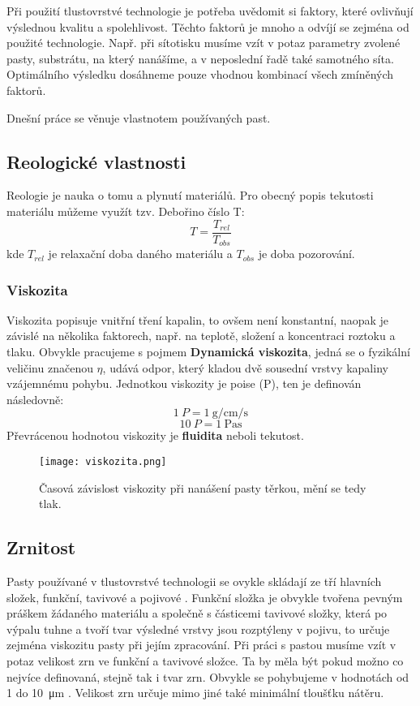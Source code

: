 Při použití tlustovrstvé technologie je potřeba uvědomit si faktory, které ovlivňují výslednou kvalitu a spolehlivost. Těchto faktorů je mnoho a odvíjí se zejména od použité technologie. 
  Např. při sítotisku musíme vzít v potaz parametry zvolené pasty, substrátu, na který nanášíme, a v neposlední řadě také samotného síta. Optimálního výsledku dosáhneme pouze vhodnou kombinací všech zmíněných faktorů. 

  Dnešní práce se věnuje vlastnotem používaných past. 
  
  \subsection{Reologické vlastnosti}
  Reologie je nauka o tomu a plynutí materiálů. Pro obecný popis tekutosti materiálu můžeme využít tzv. Debořino číslo T:
  \[
    T=  \frac{T_{rel}}{T_{obs} }
  \]
  kde \(T_{rel} \) je relaxační doba daného materiálu a \(T_{obs} \) je doba pozorování.
	
  \subsubsection{Viskozita}
    Viskozita popisuje vnitřní tření kapalin, to ovšem není konstantní, naopak je závislé na několika faktorech, např. na teplotě, složení a koncentraci roztoku a tlaku. 
    Obvykle pracujeme s pojmem \textbf{Dynamická viskozita}, jedná se o fyzikální veličinu značenou \(\eta\), udává odpor, který kladou dvě sousední vrstvy kapaliny vzájemnému pohybu. 
    Jednotkou viskozity je poise (P), ten je definován následovně:
    \[
      \qty{1}{P} = \qty{1}{\gram\per\centi\meter\per\second}
    \]
    \[  
        \qty{10}{P} = \qty{1}{\pascal\second}
    \]
    Převrácenou hodnotou viskozity je \textbf{fluidita} neboli tekutost. 

    \begin{figure}[h!]
      \centering
      \texttt{[image: viskozita.png]}
      \caption{Časová závislost viskozity při nanášení pasty těrkou, mění se tedy tlak.}
      \label{fig:viskozita-png}
    \end{figure}
    

    \subsection{Zrnitost}
      Pasty používané v tlustovrstvé technologii se ovykle skládají ze tří hlavních složek, funkční, tavivové a pojivové \cite{DiplomkaTlusteVrstvy}. Funkční složka je obvykle tvořena pevným práškem žádaného materiálu a společně s částicemi tavivové složky, která po výpalu tuhne a tvoří tvar výsledné vrstvy jsou rozptýleny v pojivu, to určuje zejména viskozitu pasty při jejím zpracování. Při práci s pastou musíme vzít v potaz velikost zrn ve funkční a tavivové složce. Ta by měla být pokud možno co nejvíce definovaná, stejně tak i tvar zrn. 
      Obvykle se pohybujeme v hodnotách od 1 do \qty{10}{\micro\meter} \cite{zadani}. Velikost zrn určuje mimo jiné také minimální tloušťku nátěru. 
      
